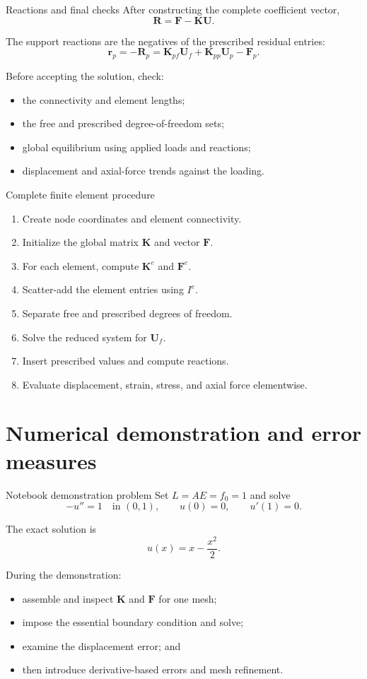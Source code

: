 \documentclass[11pt,aspectratio=169]{beamer}
\newcommand{\bK}{\bm K}
\newcommand{\bF}{\bm F}
\newcommand{\bU}{\bm U}
\newcommand{\bR}{\bm R}
\begin{document}
\begin{frame}{Reactions and final checks}
After constructing the complete coefficient vector,
\[
  \bR=\bF-\bK\bU.
\]

The support reactions are the negatives of the prescribed residual entries:
\[
  \bm r_p=-\bR_p
  =\bK_{pf}\bU_f+\bK_{pp}\bU_p-\bF_p.
\]

Before accepting the solution, check:
\begin{itemize}
  \item the connectivity and element lengths;
  \item the free and prescribed degree-of-freedom sets;
  \item global equilibrium using applied loads and reactions;
  \item displacement and axial-force trends against the loading.
\end{itemize}
\end{frame}

\begin{frame}{Complete finite element procedure}
\begin{enumerate}
  \item Create node coordinates and element connectivity.
  \item Initialize the global matrix $\bK$ and vector $\bF$.
  \item For each element, compute $\bK^e$ and $\bF^e$.
  \item Scatter-add the element entries using $I^e$.
  \item Separate free and prescribed degrees of freedom.
  \item Solve the reduced system for $\bU_f$.
  \item Insert prescribed values and compute reactions.
  \item Evaluate displacement, strain, stress, and axial force elementwise.
\end{enumerate}
\end{frame}

\section{Numerical demonstration and error measures}

\begin{frame}{Notebook demonstration problem}
Set $L=AE=f_0=1$ and solve
\[
  -u''=1\quad\text{in }(0,1),
  \qquad
  u(0)=0,
  \qquad
  u'(1)=0.
\]

The exact solution is
\[
  u(x)=x-\frac{x^2}{2}.
\]

During the demonstration:
\begin{itemize}
  \item assemble and inspect $\bK$ and $\bF$ for one mesh;
  \item impose the essential boundary condition and solve;
  \item examine the displacement error; and
  \item then introduce derivative-based errors and mesh refinement.
\end{itemize}
\end{frame}
\end{document}
